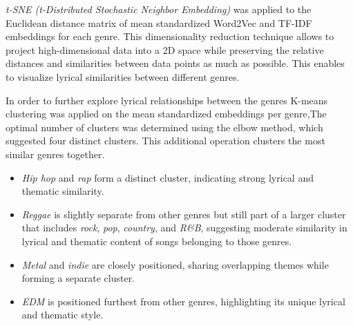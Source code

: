 \textit{t-SNE (t-Distributed Stochastic Neighbor Embedding)} was applied to the
Euclidean distance matrix of mean standardized Word2Vec and TF-IDF embeddings
for each genre. This dimensionality reduction technique allows to project
high-dimensional data into a 2D space while preserving the relative distances
and similarities between data points as much as possible. This enables to
visualize lyrical similarities between different genres.

In order to further explore lyrical relationships between the genres K-means
clustering was applied on the mean standardized embeddings per genre,The
optimal number of clusters was determined using the elbow method, which
suggested four distinct clusters. This additional operation clusters the most
similar genres together.

\begin{itemize}
  \item \textit{Hip hop} and \textit{rap} form a distinct cluster, indicating
    strong lyrical and thematic similarity.
  \item \textit{Reggae} is slightly separate from other genres but still part
    of a larger cluster that includes \textit{rock}, \textit{pop},
    \textit{country}, and \textit{R\&B}, suggesting moderate similarity in
    lyrical and thematic content of songs belonging to those genres.
  \item \textit{Metal} and \textit{indie} are closely positioned, sharing
    overlapping themes while forming a separate cluster.
  \item \textit{EDM} is positioned furthest from other genres, highlighting
    its unique lyrical and thematic style.
\end{itemize}

